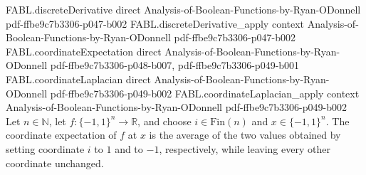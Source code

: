 \begin{theorem}
\proofstep
  {FABL.discreteDerivative}
  {direct}
  {Analysis-of-Boolean-Functions-by-Ryan-ODonnell}
  {pdf-ffbe9c7b3306-p047-b002}
\proofstep
  {FABL.discreteDerivative_apply}
  {context}
  {Analysis-of-Boolean-Functions-by-Ryan-ODonnell}
  {pdf-ffbe9c7b3306-p047-b002}
\proofstep
  {FABL.coordinateExpectation}
  {direct}
  {Analysis-of-Boolean-Functions-by-Ryan-ODonnell}
  {pdf-ffbe9c7b3306-p048-b007,
    pdf-ffbe9c7b3306-p049-b001}
\proofstep
  {FABL.coordinateLaplacian}
  {direct}
  {Analysis-of-Boolean-Functions-by-Ryan-ODonnell}
  {pdf-ffbe9c7b3306-p049-b002}
\proofstep
  {FABL.coordinateLaplacian_apply}
  {context}
  {Analysis-of-Boolean-Functions-by-Ryan-ODonnell}
  {pdf-ffbe9c7b3306-p049-b002}
Let $n\in\mathbb N$, let $f:\{−1,1\}^n\to\mathbb R$, and choose $i\in\mathrm{Fin}(n)$
and $x\in\{−1,1\}^n$. The coordinate expectation of $f$ at $x$ is the average of the two
values obtained by setting coordinate $i$ to $1$ and to $-1$, respectively, while
leaving every other coordinate unchanged.
\end{theorem}

